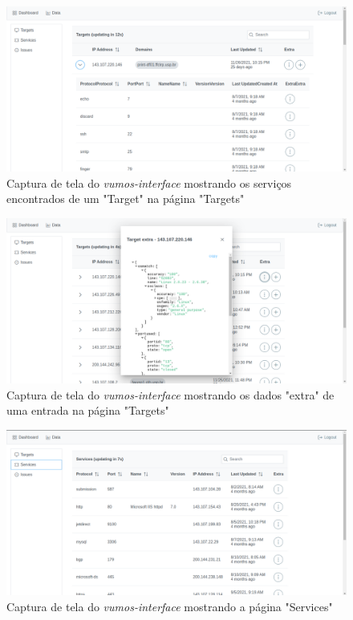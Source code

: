 \begin{figure}[H]
    \includegraphics[scale=0.32]{figuras/vumos-interface-target-service.png}
    \caption{Captura de tela do \textit{vumos-interface} mostrando os serviços encontrados de um "Target" na página "Targets"}
\end{figure}

\begin{figure}[H]
    \includegraphics[scale=0.32]{figuras/vumos-interface-target-extra.png}
    \caption{Captura de tela do \textit{vumos-interface} mostrando os dados "extra" de uma entrada na página "Targets"}
\end{figure}

\begin{figure}[H]
    \includegraphics[scale=0.32]{figuras/vumos-interface-services.png}
    \caption{Captura de tela do \textit{vumos-interface} mostrando a página "Services"}
\end{figure}

